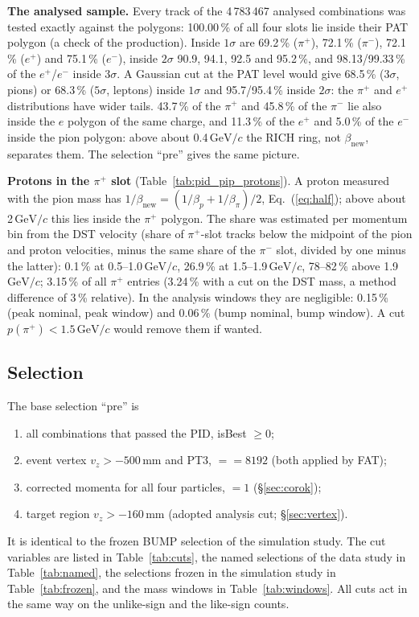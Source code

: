 \documentclass[11pt,a4paper]{article}
\newcommand{\pip}{\ensuremath{\pi^{+}}\xspace}
\newcommand{\pim}{\ensuremath{\pi^{-}}\xspace}
\newcommand{\betanew}{\ensuremath{\beta_{\mathrm{new}}}\xspace}
\newcommand{\GeVc}{\ensuremath{\mathrm{GeV}/c}\xspace}
\newcommand{\code}[1]{\texttt{\detokenize{#1}}}
\newcommand{\vz}{\ensuremath{v_z}\xspace}
\newcommand{\inputplaincode}[1]{\begingroup\renewcommand{\code}[1]{\texttt{##1}}\endgroup}
\begin{document}
\inputplaincode{tables_exp/pid_samples_cnt.tex}

\textbf{The analysed sample.} Every track of the 4\,783\,467 analysed combinations was tested exactly against the
polygons: 100.00\,\% of all four slots lie inside their PAT polygon (a check of the production). Inside
$1\sigma$ are 69.2\,\% (\pip), 72.1\,\% (\pim), 72.1\,\% ($e^+$) and 75.1\,\% ($e^-$), inside $2\sigma$ 90.9, 94.1,
92.5 and 95.2\,\%, and 98.13/99.33\,\% of the $e^+$/$e^-$ inside $3\sigma$. A Gaussian cut at the PAT level would give
68.5\,\% ($3\sigma$, pions) or 68.3\,\% ($5\sigma$, leptons) inside $1\sigma$ and 95.7/95.4\,\% inside $2\sigma$: the \pip and $e^+$
distributions have wider tails. 43.7\,\% of the \pip and 45.8\,\% of the
\pim lie also inside the $e$ polygon of the same charge, and 11.3\,\% of the $e^+$ and 5.0\,\% of the $e^-$ inside
the pion polygon: above about 0.4\,\GeVc the RICH ring, not $\betanew$, separates them. The selection ``pre''
gives the same picture.

\textbf{Protons in the \pip slot} (Table~\ref{tab:pid_pip_protons}). A proton measured with the pion mass has
$1/\betanew=(1/\beta_p+1/\beta_\pi)/2$, Eq.~(\ref{eq:half}); above about 2\,\GeVc this lies inside the \pip polygon.
The share was estimated per momentum bin from the DST velocity (share of \pip-slot tracks below the midpoint of
the pion and proton velocities, minus the same share of the \pim slot, divided by one minus the latter): 0.1\,\%
at 0.5--1.0\,\GeVc, 26.9\,\% at 1.5--1.9\,\GeVc, 78--82\,\% above 1.9\,\GeVc; 3.15\,\% of all \pip entries (3.24\,\%
with a cut on the DST mass, a method difference of 3\,\% relative). In the analysis windows they are negligible:
0.15\,\% (peak nominal, peak window) and 0.06\,\% (bump nominal, bump window). A cut $p(\pip)<1.5$\,\GeVc would
remove them if wanted.



\subsection{Selection}
\label{sec:sel}
The base selection ``pre'' is
\begin{enumerate}
\setlength{\itemsep}{0pt}
\item all combinations that passed the PID, isBest $\ge0$;
\item event vertex $\vz>-500$\,mm and PT3, \code{trigbit} $==8192$ (both applied by FAT);
\item corrected momenta for all four particles, \code{cor_ok} $=1$ (\S\ref{sec:corok});
\item target region $\vz>-160$\,mm (adopted analysis cut; \S\ref{sec:vertex}).
\end{enumerate}
It is identical to the frozen BUMP selection of the simulation study. The cut variables are listed in
Table~\ref{tab:cuts}, the named selections of the data study in Table~\ref{tab:named}, the selections frozen in
the simulation study in Table~\ref{tab:frozen}, and the mass windows in Table~\ref{tab:windows}. All cuts act
in the same way on the unlike-sign and the like-sign counts.
\end{document}
